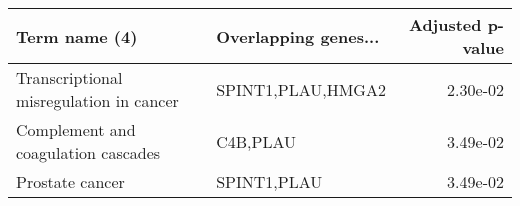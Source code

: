 \begin{tabular}{llr}
\toprule
                          Term name (4) & Overlapping genes... &  Adjusted p-value \\
\midrule
Transcriptional misregulation in cancer &    SPINT1,PLAU,HMGA2 &          2.30e-02 \\
    Complement and coagulation cascades &             C4B,PLAU &          3.49e-02 \\
                        Prostate cancer &          SPINT1,PLAU &          3.49e-02 \\
\bottomrule
\end{tabular}
